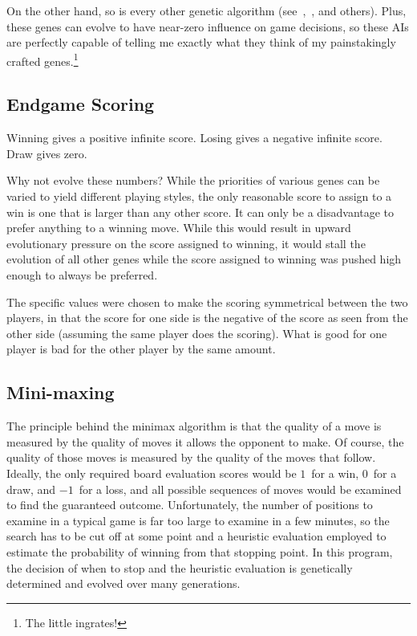 \documentclass[letterpaper]{article}
\renewcommand{\_}{\allowbreak\textunderscore\allowbreak}
\begin{document}
On the other hand, so is every other genetic algorithm (see~\cite{evolved-antenna},~\cite{evolved-stellarator}, and others). Plus, these genes can evolve to have near-zero influence on game decisions, so these AIs are perfectly capable of telling me exactly what they think of my painstakingly crafted genes.\footnote{The little ingrates!}

\subsection{Endgame Scoring}

Winning gives a positive infinite score.
Losing gives a negative infinite score.
Draw gives zero.

Why not evolve these numbers? While the priorities of various genes can be varied to yield different playing styles, the only reasonable score to assign to a win is one that is larger than any other score. It can only be a disadvantage to prefer anything to a winning move. While this would result in upward evolutionary pressure on the score assigned to winning, it would stall the evolution of all other genes while the score assigned to winning was pushed high enough to always be preferred.

The specific values were chosen to make the scoring symmetrical between the two players, in that the score for one side is the negative of the score as seen from the other side (assuming the same player does the scoring). What is good for one player is bad for the other player by the same amount.

\subsection{Mini-maxing}

The principle behind the minimax algorithm is that the quality of a move is measured by the quality of moves it allows the opponent to make. Of course, the quality of those moves is measured by the quality of the moves that follow. Ideally, the only required board evaluation scores would be \(1\)~for a win, \(0\)~for a draw, and \(-1\)~for a loss, and all possible sequences of moves would be examined to find the guaranteed outcome. Unfortunately, the number of positions to examine in a typical game is far too large to examine in a few minutes, so the search has to be cut off at some point and a heuristic evaluation employed to estimate the probability of winning from that stopping point. In this program, the decision of when to stop and the heuristic evaluation is genetically determined and evolved over many generations.
\end{document}
